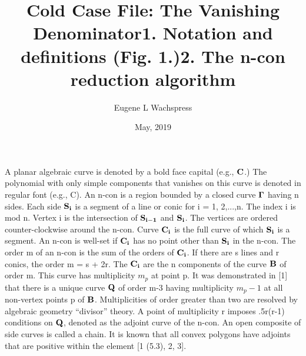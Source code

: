 \documentclass{article}
\title{Cold Case File: The Vanishing Denominator}
\author{ Eugene L Wachspress}
\date {May, 2019}
\begin{document}
\maketitle

\par
\par
\title{1. Notation and definitions (Fig. 1.)}
\par
A planar algebraic curve is denoted by a bold face capital (e.g., $\bf{C}$.)  The polynomial with only simple components that vanishes on this curve is denoted in regular font (e.g., C).
An n-con is a region bounded by a closed curve $\bf{\Gamma}$ having n sides.  Each side $\bf{S}_i$ is a segment of a line or conic for i  = 1, 2,...,n.  The index i is mod n.  Vertex i is the intersection of $\bf{S}_{i-1}$ and $\bf{S}_i$.  The vertices are ordered counter-clockwise around the n-con.  Curve $\bf{C}_i$ is the full curve of which $\bf{S}_i$ is a segment.  An n-con is well-set if $\bf{C}_i$ has no point other than $\bf{S}_i$ in the n-con. The order m of an n-con is the sum of the orders of $\bf{C}_i$.  If there are s lines and r conics, the order m = s + 2r.  The $\bf{C}_i$ are the n components of the curve $\bf{B}$ of order m.  This curve has multiplicity $m_p$ at point p.  It was demonstrated in [1] that there is a unique curve $\bf{Q}$ of order m-3 having multiplicity $m_p - 1$ at all non-vertex points p of $\bf{B}$.  Multiplicities of order greater than two are resolved by algebraic geometry ``divisor'' theory.  A point of multiplicity r imposes .5r(r-1) conditions on $\bf{Q}$, denoted as the adjoint curve of the n-con.   An open composite of side curves is called a chain.  It is known that all convex polygons have adjoints that are positive within the element [1 (5.3), 2, 3].  
\par
\title{2.  The n-con reduction algorithm}
\par
\end{document}
